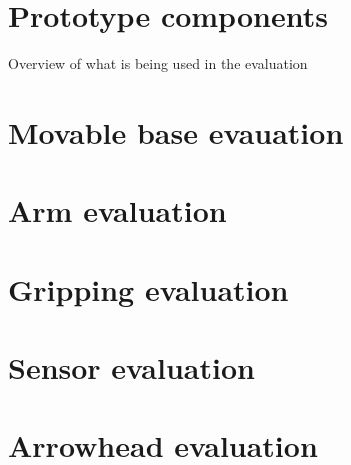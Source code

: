 \section*{Prototype components}
Overview of what is being used in the evaluation
\section*{Movable base evauation}
\section*{Arm evaluation}
\section*{Gripping evaluation}
\section*{Sensor evaluation}
\section*{Arrowhead evaluation}